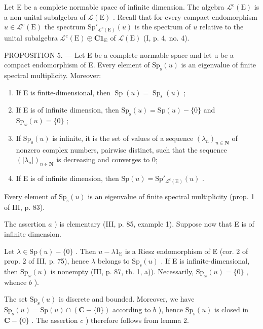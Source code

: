 Let E be a complete normable space of infinite dimension. The algebra \(\mathcal{L}^{\mathrm{c}}(\mathrm{E})\) is a non-unital subalgebra of \(\mathcal{L}(\mathrm{E})\) . Recall that for every compact endomorphism \(u \in \mathcal{L}^{\mathrm{c}}(\mathrm{E})\) the spectrum \(\mathrm{Sp}'_{\mathcal{L}^{\mathrm{c}}(\mathrm{E})}(u)\) is the spectrum of \(u\) relative to the unital subalgebra \(\mathcal{L}^{\mathrm{c}}(\mathrm{E}) \oplus \mathbf{C1}_{\mathrm{E}}\) of \(\mathcal{L}(\mathrm{E})\) (I, p. 4, no. 4).

PROPOSITION 5. — Let E be a complete normable space and let u be a compact endomorphism of E. Every element of \(\mathrm{Sp}_{\mathrm{s}}(u)\) is an eigenvalue of finite spectral multiplicity. Moreover:

\begin{enumerate}
\def\labelenumi{\alph{enumi})}
\item
  If E is finite-dimensional, then \(\operatorname{Sp}(u) = \operatorname{Sp}_{\mathrm{s}}(u)\) ;
\item
  If E is of infinite dimension, then \(\mathrm{Sp}_{\mathrm{s}}(u) = \mathrm{Sp}(u) - \{0\}\) and \(\mathrm{Sp}_{\omega}(u) = \{0\}\) ;
\item
  If \(\mathrm{Sp}_{\mathrm{s}}(u)\) is infinite, it is the set of values of a sequence \((\lambda_{n})_{n\in\mathbf{N}}\) of nonzero complex numbers, pairwise distinct, such that the sequence \((|\lambda_{n}|)_{n\in\mathbf{N}}\) is decreasing and converges to 0;
\item
  If E is of infinite dimension, then \(\mathrm{Sp}(u) = \mathrm{Sp}'_{\mathcal{L}^c (\mathrm{E})}(u)\) .
\end{enumerate}

Every element of \(\mathrm{Sp}_{\mathrm{s}}(u)\) is an eigenvalue of finite spectral multiplicity (prop. 1 of III, p. 83).

The assertion \(a\) ) is elementary (III, p. 85, example 1). Suppose now that E is of infinite dimension.

Let \(\lambda \in \mathrm{Sp}(u) - \{0\}\) . Then \(u - \lambda 1_{\mathrm{E}}\) is a Riesz endomorphism of E (cor. 2 of prop. 2 of III, p. 75), hence \(\lambda\) belongs to \(\mathrm{Sp}_{\mathrm{s}}(u)\) . If E is infinite-dimensional, then \(\mathrm{Sp}_{\omega}(u)\) is nonempty (III, p. 87, th. 1, a)). Necessarily, \(\mathrm{Sp}_{\omega}(u) = \{0\}\) , whence \(b\) ).

The set \(\mathrm{Sp}_{\mathrm{s}}(u)\) is discrete and bounded. Moreover, we have \(\mathrm{Sp}_{\mathrm{s}}(u) = \mathrm{Sp}(u) \cap (\mathbf{C} - \{0\})\) according to \(b\) ), hence \(\mathrm{Sp}_{\mathrm{s}}(u)\) is closed in \(\mathbf{C} - \{0\}\) . The assertion \(c\) ) therefore follows from lemma 2.

